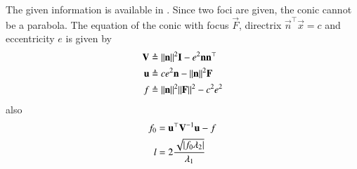 The given information is available in 
.
Since two foci are given, the conic cannot be a parabola.
The equation of the conic with focus $\vec{F}$, directrix $\vec{n}^\top\vec{x} = c$ and eccentricity $e$ is given by
\begin{align}
\boldsymbol{\mathbf{V}} &\triangleq \lVert\boldsymbol{\mathbf{n}}\rVert^2\boldsymbol{\mathbf{I}} - e^2\boldsymbol{\mathbf{n}}\boldsymbol{\mathbf{n}}^\top \label{eq:chapters/11/11/4/13/2} \\
\boldsymbol{\mathbf{u}} &\triangleq ce^2\boldsymbol{\mathbf{n}} - \lVert\boldsymbol{\mathbf{n}}\rVert^2\boldsymbol{\mathbf{F}} \label{eq:chapters/11/11/4/13/3} \\
f &\triangleq \lVert\boldsymbol{\mathbf{n}}\rVert^2\lVert\boldsymbol{\mathbf{F}}\rVert^2 - c^2e^2 \label{eq:chapters/11/11/4/13/4}
\end{align}
also
\begin{align}
f_0 &= \boldsymbol{\mathbf{u}}^\top\boldsymbol{\mathbf{V}}^{-1}\boldsymbol{\mathbf{u}} - f\\
l &= 2\frac{\sqrt{\left\vert f_0\lambda_2\right\vert}}{\lambda_1}
\end{align}

